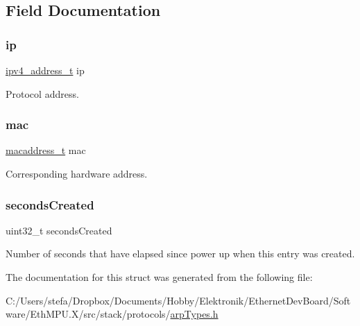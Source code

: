 \subsection{Field Documentation}
\mbox{\label{struct_a_r_p__table_entry__t_a8788f788aa5f4c53d49e312f6589769a}} 
\subsubsection{\texorpdfstring{ip}{ip}}
{\footnotesize\ttfamily \mbox{\hyperlink{group__ipv4_gad9df0882950e70d0587a4b423beb261a}{ipv4\+\_\+address\+\_\+t}} ip}



Protocol address. 

\mbox{\label{struct_a_r_p__table_entry__t_a815eb066061f1dd9afdb6c6eee48f46e}} 
\subsubsection{\texorpdfstring{mac}{mac}}
{\footnotesize\ttfamily \mbox{\hyperlink{group__ethernet_gacb865bcbf50a6c8cef05581bfabff373}{macaddress\+\_\+t}} mac}



Corresponding hardware address. 

\mbox{\label{struct_a_r_p__table_entry__t_a06c3d88e59b26905ae3d434ff0b6e23e}} 
\subsubsection{\texorpdfstring{secondsCreated}{secondsCreated}}
{\footnotesize\ttfamily uint32\+\_\+t seconds\+Created}



Number of seconds that have elapsed since power up when this entry was created. 



The documentation for this struct was generated from the following file\+:\begin{DoxyCompactItemize}
\item 
C\+:/\+Users/stefa/\+Dropbox/\+Documents/\+Hobby/\+Elektronik/\+Ethernet\+Dev\+Board/\+Software/\+Eth\+M\+P\+U.\+X/src/stack/protocols/\mbox{\hyperlink{arp_types_8h}{arp\+Types.\+h}}\end{DoxyCompactItemize}
